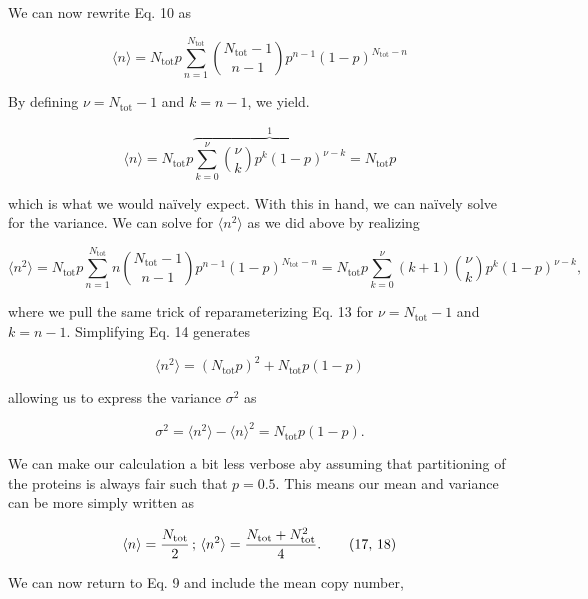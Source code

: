 We can now rewrite Eq. 10 as

\begin{equation}
\langle n \rangle = N_\text{tot} p \sum\limits_{n= 1}^{N_\text{tot}}{{N_\text{tot} - 1}\choose{n - 1}}p^{n - 1}(1 - p)^{N_\text{tot} - n} \tag{12}
\end{equation}

By defining $\nu = N_\text{tot} - 1$ and $k = n - 1$, we yield.

\begin{equation}
\langle n \rangle = N_\text{tot} p \overbrace{\sum\limits_{k= 0}^{\nu}{{\nu}\choose{k}}p^k(1 - p)^{\nu - k}}^\text{1} = N_\text{tot} p \tag{13}
\end{equation}

which is what we would naïvely expect. With this in hand, we can naïvely solve for the variance. We can solve for $\langle n^2 \rangle$ as we did above by realizing

\begin{equation}
\langle n^2 \rangle = N_\text{tot}p\sum\limits_{n=1}^{N_\text{tot}}n{{N_\text{tot} - 1}\choose{n -1}}p^{n-1}(1 - p)^{N_\text{tot} - n} = N_\text{tot}p\sum\limits_{k=0}^\nu(k + 1){{\nu}\choose{k}}p^k(1-p)^{\nu - k}  \tag{14},
\end{equation}

where we pull the same trick of reparameterizing Eq. 13 for $\nu = N_\text{tot} - 1$ and $k = n - 1$. Simplifying Eq. 14 generates

\begin{equation}
\langle n^2 \rangle = (N_\text{tot}p)^2 + N_\text{tot}p(1 - p) \tag{15}
\end{equation}

allowing us to express the variance $\sigma^2$ as

\begin{equation}
\sigma^2 = \langle n^2 \rangle - \langle n \rangle^2 = N_\text{tot}p(1 - p). \tag{16}
\end{equation}

We can make our calculation a bit less verbose aby assuming that partitioning of the proteins is always fair such that $p = 0.5$. This means our mean and variance can be more simply written as

\begin{equation}
\langle n \rangle = {N_\text{tot} \over 2}\, ; \, \langle n^2 \rangle= {N_\text{tot}+ N_\text{tot}^2 \over 4}. \tag{17, 18}
\end{equation}

We can now return to Eq. 9 and include the mean copy number,


